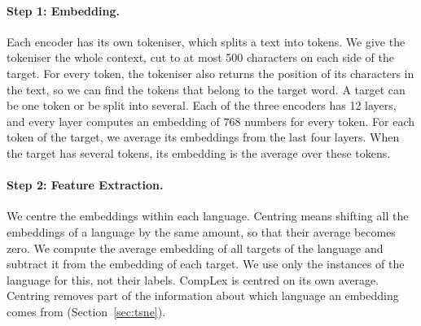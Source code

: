 \paragraph{Step 1: Embedding.} Each encoder has its own tokeniser, which splits a text into tokens. %
We give the tokeniser the whole context, cut to at most 500 characters on each side %
of the target. For every token, the tokeniser also returns the position of its characters in the %
text, so we can find the tokens that belong to the target word. A target can be one token or be
split into several. Each of the three encoders has 12 layers, and every layer computes an embedding %
of 768 numbers for every token. For each token of the target, we average its embeddings from the
last four layers. When the target has several tokens, its embedding is the average over these %
tokens.

\paragraph{Step 2: Feature Extraction.} We centre the embeddings within each language. Centring
means shifting all the embeddings of a language by the same amount, so that their average becomes
zero. We compute the average embedding of all targets of the language and subtract it from the %
embedding of each target. We use only the instances of the language for this, not their labels.
CompLex is centred on its own average. Centring removes part of the information about which %
language an embedding comes from (Section~\ref{sec:tsne}).

